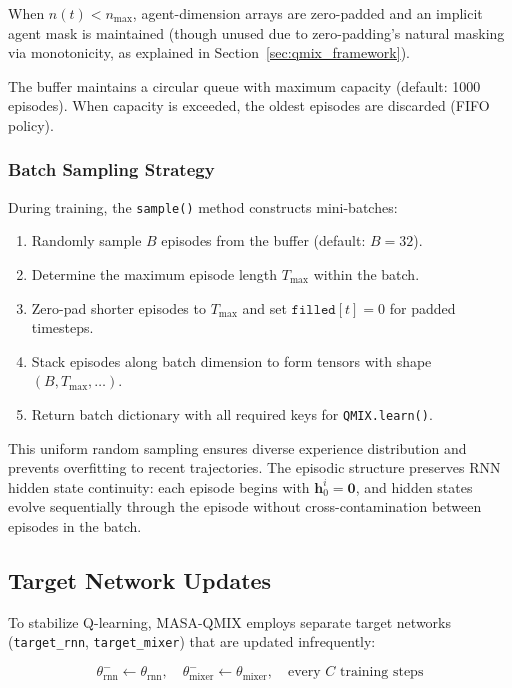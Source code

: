 When \(n(t) < n_{\max}\), agent-dimension arrays are zero-padded and an implicit agent mask is maintained (though unused due to zero-padding's natural masking via monotonicity, as explained in Section~\ref{sec:qmix_framework}).

The buffer maintains a circular queue with maximum capacity (default: 1000 episodes). When capacity is exceeded, the oldest episodes are discarded (FIFO policy).

\subsubsection{Batch Sampling Strategy}

During training, the \texttt{sample()} method constructs mini-batches:

\begin{enumerate}
\item Randomly sample \(B\) episodes from the buffer (default: \(B = 32\)).
\item Determine the maximum episode length \(T_{\max}\) within the batch.
\item Zero-pad shorter episodes to \(T_{\max}\) and set \(\texttt{filled}[t] = 0\) for padded timesteps.
\item Stack episodes along batch dimension to form tensors with shape \((B, T_{\max}, \ldots)\).
\item Return batch dictionary with all required keys for \texttt{QMIX.learn()}.
\end{enumerate}

This uniform random sampling ensures diverse experience distribution and prevents overfitting to recent trajectories. The episodic structure preserves RNN hidden state continuity: each episode begins with \(\mathbf{h}_0^i = \mathbf{0}\), and hidden states evolve sequentially through the episode without cross-contamination between episodes in the batch.

\subsection{Target Network Updates}
\label{sec:target_updates}

To stabilize Q-learning, MASA-QMIX employs separate target networks (\texttt{target\_rnn}, \texttt{target\_mixer}) that are updated infrequently:

\[
\theta^-_{\text{rnn}} \leftarrow \theta_{\text{rnn}}, \quad \theta^-_{\text{mixer}} \leftarrow \theta_{\text{mixer}}, \quad \text{every } C \text{ training steps}
\]

